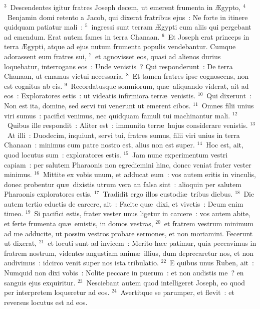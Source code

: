${}^{3}$~Descendentes igitur fratres Joseph decem, ut emerent frumenta in \AE gypto,
${}^{4}$~Benjamin domi retento a Jacob, qui dixerat fratribus ejus~: Ne forte in itinere quidquam patiatur mali~:
${}^{5}$~ingressi sunt terram \AE gypti cum aliis qui pergebant ad emendum. Erat autem fames in terra Chanaan.
${}^{6}$~Et Joseph erat princeps in terra \AE gypti, atque ad ejus nutum frumenta populis vendebantur. Cumque adorassent eum fratres sui,
${}^{7}$~et agnovisset eos, quasi ad alienos durius loquebatur, interrogans eos~: Unde venistis~? Qui responderunt~: De terra Chanaan, ut emamus victui necessaria.
${}^{8}$~Et tamen fratres ipse cognoscens, non est cognitus ab eis.
${}^{9}$~Recordatusque somniorum, qu\ae\ aliquando viderat, ait ad eos~: Exploratores estis~: ut videatis infirmiora terr\ae\ venistis.
${}^{10}$~Qui dixerunt~: Non est ita, domine, sed servi tui venerunt ut emerent cibos.
${}^{11}$~Omnes filii unius viri sumus~: pacifici venimus, nec quidquam famuli tui machinantur mali.
${}^{12}$~Quibus ille respondit~: Aliter est~: immunita terr\ae\ hujus considerare venistis.
${}^{13}$~At illi~: Duodecim, inquiunt, servi tui, fratres sumus, filii viri unius in terra Chanaan~: minimus cum patre nostro est, alius non est super.
${}^{14}$~Hoc est, ait, quod locutus sum~: exploratores estis.
${}^{15}$~Jam nunc experimentum vestri capiam~: per salutem Pharaonis non egrediemini hinc, donec veniat frater vester minimus.
${}^{16}$~Mittite ex vobis unum, et adducat eum~: vos autem eritis in vinculis, donec probentur qu\ae\ dixistis utrum vera an falsa sint~: alioquin per salutem Pharaonis exploratores estis.
${}^{17}$~Tradidit ergo illos custodi\ae\ tribus diebus.
${}^{18}$~Die autem tertio eductis de carcere, ait~: Facite qu\ae\ dixi, et vivetis~: Deum enim timeo.
${}^{19}$~Si pacifici estis, frater vester unus ligetur in carcere~: vos autem abite, et ferte frumenta qu\ae\ emistis, in domos vestras,
${}^{20}$~et fratrem vestrum minimum ad me adducite, ut possim vestros probare sermones, et non moriamini. Fecerunt ut dixerat,
${}^{21}$~et locuti sunt ad invicem~: Merito h\ae c patimur, quia peccavimus in fratrem nostrum, videntes angustiam anim\ae\ illius, dum deprecaretur nos, et non audivimus~: idcirco venit super nos ista tribulatio.
${}^{22}$~E quibus unus Ruben, ait~: Numquid non dixi vobis~: Nolite peccare in puerum~: et non audistis me~? en sanguis ejus exquiritur.
${}^{23}$~Nesciebant autem quod intelligeret Joseph, eo quod per interpretem loqueretur ad eos.
${}^{24}$~Avertitque se parumper, et flevit~: et reversus locutus est ad eos.


